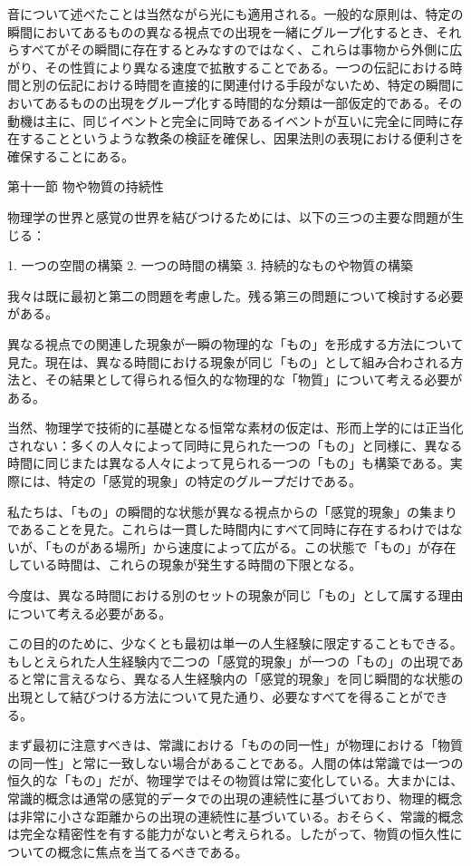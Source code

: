 \documentclass[a4paper,11pt,openany]{ltjsbook}
\begin{document}
音について述べたことは当然ながら光にも適用される。一般的な原則は、特定の瞬間においてあるものの異なる視点での出現を一緒にグループ化するとき、それらすべてがその瞬間に存在するとみなすのではなく、これらは事物から外側に広がり、その性質により異なる速度で拡散することである。一つの伝記における時間と別の伝記における時間を直接的に関連付ける手段がないため、特定の瞬間においてあるものの出現をグループ化する時間的な分類は一部仮定的である。その動機は主に、同じイベントと完全に同時であるイベントが互いに完全に同時に存在することというような教条の検証を確保し、因果法則の表現における便利さを確保することにある。

第十一節 物や物質の持続性

物理学の世界と感覚の世界を結びつけるためには、以下の三つの主要な問題が生じる：

1. 一つの空間の構築
2. 一つの時間の構築
3. 持続的なものや物質の構築

我々は既に最初と第二の問題を考慮した。残る第三の問題について検討する必要がある。

異なる視点での関連した現象が一瞬の物理的な「もの」を形成する方法について見た。現在は、異なる時間における現象が同じ「もの」として組み合わされる方法と、その結果として得られる恒久的な物理的な「物質」について考える必要がある。

当然、物理学で技術的に基礎となる恒常な素材の仮定は、形而上学的には正当化されない：多くの人々によって同時に見られた一つの「もの」と同様に、異なる時間に同じまたは異なる人々によって見られる一つの「もの」も構築である。実際には、特定の「感覚的現象」の特定のグループだけである。

私たちは、「もの」の瞬間的な状態が異なる視点からの「感覚的現象」の集まりであることを見た。これらは一貫した時間内にすべて同時に存在するわけではないが、「ものがある場所」から速度によって広がる。この状態で「もの」が存在している時間は、これらの現象が発生する時間の下限となる。

今度は、異なる時間における別のセットの現象が同じ「もの」として属する理由について考える必要がある。

この目的のために、少なくとも最初は単一の人生経験に限定することもできる。もしとえられた人生経験内で二つの「感覚的現象」が一つの「もの」の出現であると常に言えるなら、異なる人生経験内の「感覚的現象」を同じ瞬間的な状態の出現として結びつける方法について見た通り、必要なすべてを得ることができる。

まず最初に注意すべきは、常識における「ものの同一性」が物理における「物質の同一性」と常に一致しない場合があることである。人間の体は常識では一つの恒久的な「もの」だが、物理学ではその物質は常に変化している。大まかには、常識的概念は通常の感覚的データでの出現の連続性に基づいており、物理的概念は非常に小さな距離からの出現の連続性に基づいている。おそらく、常識的概念は完全な精密性を有する能力がないと考えられる。したがって、物質の恒久性についての概念に焦点を当てるべきである。
\end{document}
